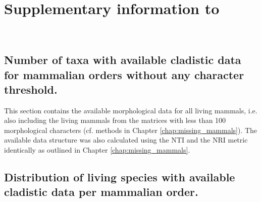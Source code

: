 %
%

\chapter{Supplementary information to }
\label{chap:Appendix_missing_mammals}

\bigskip
\medskip
\begin{center}

 \\
\bigskip
\end{center}


\section{Number of taxa with available cladistic data for mammalian orders without any character threshold.}

This section contains the available morphological data for all living mammals, i.e. also including the living mammals from the matrices with less than 100 morphological characters (cf. methods in Chapter \ref{chap:missing_mammals}).
The available data structure was also calculated using the NTI and the NRI metric identically as outlined in Chapter \ref{chap:missing_mammals}.



\section{Distribution of living species with available cladistic data per mammalian order.}

